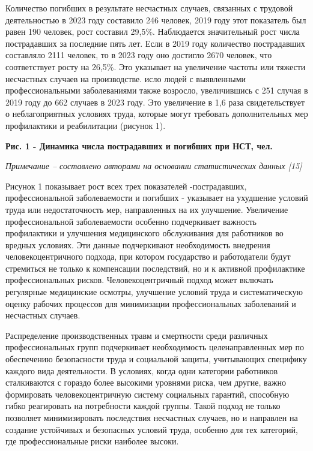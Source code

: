 Количество погибших в результате несчастных случаев, связанных с
трудовой деятельностью в 2023 году составило 246 человек, 2019 году этот
показатель был равен 190 человек, рост составил 29,5\%. Наблюдается
значительный рост числа пострадавших за последние пять лет. Если в 2019
году количество пострадавших составляло 2111 человек, то в 2023 году оно
достигло 2670 человек, что соответствует росту на 26,5\%. Это указывает
на увеличение частоты или тяжести несчастных случаев на производстве.
исло людей с выявленными профессиональными заболеваниями также возросло,
увеличившись с 251 случая в 2019 году до 662 случаев в 2023 году. Это
увеличение в 1,6 раза свидетельствует о неблагоприятных условиях труда,
которые могут требовать дополнительных мер профилактики и реабилитации
(рисунок 1).

{\bfseries Рис. 1 - Динамика числа пострадавших и погибших при НСТ, чел.}

\emph{Примечание -- составлено авторами на основании статистических
данных {[}15{]}}

Рисунок 1 показывает рост всех трех показателей -пострадавших,
профессиональной заболеваемости и погибших - указывает на ухудшение
условий труда или недостаточность мер, направленных на их улучшение.
Увеличение профессиональной заболеваемости особенно подчеркивает
важность профилактики и улучшения медицинского обслуживания для
работников во вредных условиях. Эти данные подчеркивают необходимость
внедрения человекоцентричного подхода, при котором государство и
работодатели будут стремиться не только к компенсации последствий, но и
к активной профилактике профессиональных рисков. Человекоцентричный
подход может включать регулярные медицинские осмотры, улучшение условий
труда и систематическую оценку рабочих процессов для минимизации
профессиональных заболеваний и несчастных случаев.

Распределение производственных травм и смертности среди различных
профессиональных групп подчеркивает необходимость целенаправленных мер
по обеспечению безопасности труда и социальной защиты, учитывающих
специфику каждого вида деятельности. В условиях, когда одни категории
работников сталкиваются с гораздо более высокими уровнями риска, чем
другие, важно формировать человекоцентричную систему социальных
гарантий, способную гибко реагировать на потребности каждой группы.
Такой подход не только позволяет минимизировать последствия несчастных
случаев, но и направлен на создание устойчивых и безопасных условий
труда, особенно для тех категорий, где профессиональные риски наиболее
высоки.

